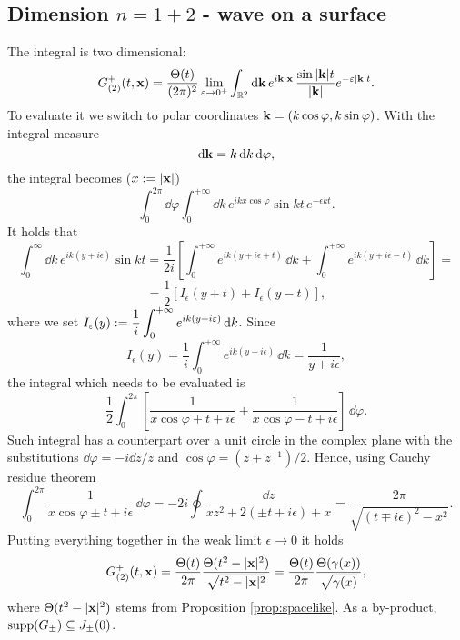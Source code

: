 \subsection*{Dimension $n=1+2$ - wave on a surface}
The integral is two dimensional:
\[	G_{(2)}^{+}(t,\mathbf{x})=\frac{\Theta( t)}{(2\pi)^{2}}\lim_{\varepsilon\to 0^+}\int_{{\mathbb R}^{2}}\mathrm d\mathbf{k}\,e^{i\mathbf{k}\cdot\mathbf{x}}\, \frac{\sin|\mathbf{k}|t}{|\mathbf{k}|}e^{-\varepsilon|\mathbf{k}| t}.		\]
To evaluate it we switch to polar coordinates $\mathbf{k}=(k\cos\varphi,k\sin\varphi)$. With the integral measure
\[	\mathrm d \mathbf{k}=k\, \mathrm d k\,\mathrm d\varphi	,	\]
the integral becomes ($x:=|\mathbf{x}|$)
\[	\int_{0}^{2\pi}\dd\varphi\int_{0}^{+\infty}\dd k\,e^{ik x\cos\varphi}	\sin k t\,e^{-\epsilon k t}.	\]
It holds that 
\[	\int_{0}^{\infty}\dd k\,e^{ik (y+i\epsilon)}	\sin k t=\frac{1}{2i}\left[\int_{0}^{+\infty}e^{ik (y+i\epsilon +t)}\,\dd k+\int_{0}^{+\infty}e^{i k (y+i\epsilon-t)}\,\dd k\right]=\] \[=\frac{1}{2}\left[I_\epsilon(y+t)+I_\epsilon(y-t)\right],		\]
where we set $\displaystyle I_\varepsilon(y):=\frac{1}{i}\int_{0}^{+\infty}e^{i k (y+i\varepsilon)}\,\mathrm d k$. Since
\[	I_\epsilon(y)= \frac{1}{i}\int_{0}^{+\infty}e^{i k (y+i\epsilon)}\,\dd k=\frac{1}{y+i\epsilon},	\]
the integral which needs to be evaluated is
\[	\frac{1}{2}\int_{0}^{2\pi}\left[\frac{1}{x\cos\varphi+t+i\epsilon}+\frac{1}{x\cos\varphi-t+i\epsilon}\right]\,\dd\varphi.	\]
Such integral has a counterpart over a unit circle in the complex plane with the substitutions $\dd\varphi=-i\dd z/z$ and $\cos\varphi=(z+z^{-1})/2$. Hence, using Cauchy residue theorem
\[	\int_{0}^{2\pi}\frac{1}{x\cos\varphi\pm t+i\epsilon}\,\dd\varphi=-2i\oint\frac{\dd z}{xz^2+2(\pm t+i\epsilon)+x}	=\frac{2\pi}{\sqrt{(t\mp i\epsilon)^2-x^2}}.	\]
Putting everything together in the weak limit $\epsilon\to 0$ it holds
\begin{equation}
G_{(2)}^{+}(t,\mathbf{x})=\frac{\Theta( t)}{2\pi}\frac{\Theta(t^2-|\mathbf{x}|^2)}{\sqrt{t^2-|\mathbf{x}|^2}}=\frac{\Theta( t)}{2\pi}\frac{\Theta(\gamma(x))}{\sqrt{\gamma(x)}},
\label{eq:green2d}
\end{equation}
where $\Theta(t^2-|\mathbf{x}|^2)$ stems from Proposition \ref{prop:spacelike}. As a by-product, $\text{supp} (G_\pm)\subseteq J_{\pm}(0)$.
